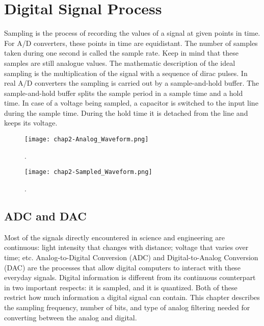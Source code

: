 \chapter{Digital Signal Process} %

\label{Chapter2} %


\cite{wiki-dsp-sampling}
Sampling is the process of recording the values of a signal at given points in time. For A/D converters, these points in time are equidistant. The number of samples taken during one second is called the sample rate. Keep in mind that these samples are still analogue values. The mathematic description of the ideal sampling is the multiplication of the signal with a sequence of dirac pulses. In real A/D converters the sampling is carried out by a sample-and-hold buffer. The sample-and-hold buffer splits the sample period in a sample time and a hold time. In case of a voltage being sampled, a capacitor is switched to the input line during the sample time. During the hold time it is detached from the line and keeps its voltage.

\begin{figure}[ht]
  \label{fig:chap2-Analog_Waveform}
  \centering
	\texttt{[image: chap2-Analog\_Waveform.png]}
	\caption{.}
\end{figure}
\begin{figure}[ht]
  \label{fig:chap2-Sampled_Waveform}
  \centering
	\texttt{[image: chap2-Sampled\_Waveform.png]}
	\caption{.}
\end{figure}

\section{ADC and DAC}\cite{smith1997dspbook}
Most of the signals directly encountered in science and engineering are continuous: light intensity that changes with distance; voltage that varies over time; etc. Analog-to-Digital Conversion (ADC) and Digital-to-Analog Conversion (DAC) are the processes that allow digital computers to interact with these everyday signals. Digital information is different from its continuous counterpart in two important respects: it is sampled, and it is quantized. Both of these restrict how much information a digital signal can
contain. This chapter describes the sampling frequency, number of bits, and type of analog filtering needed for converting between the analog and digital.

